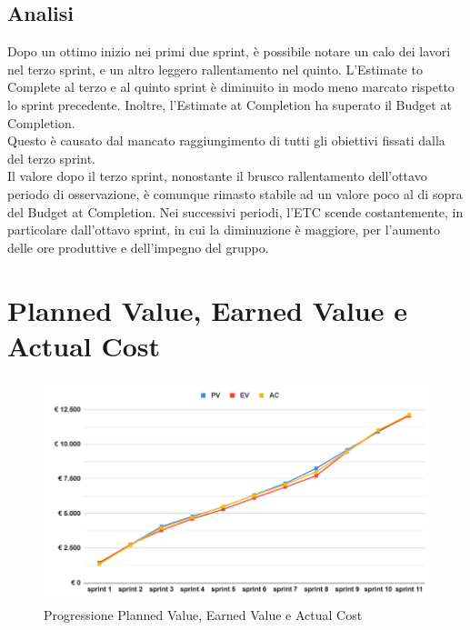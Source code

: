 \subsection{Analisi}
Dopo un ottimo inizio nei primi due sprint, è possibile notare un calo dei lavori nel terzo sprint, e un altro leggero rallentamento nel quinto. L'Estimate to Complete al terzo e al quinto sprint è diminuito in modo meno marcato rispetto lo sprint precedente. Inoltre, l'Estimate at Completion ha superato il Budget at Completion.\\
Questo è causato dal mancato raggiungimento di tutti gli obiettivi fissati dalla  del terzo sprint.\\
Il valore dopo il terzo sprint, nonostante il brusco rallentamento dell'ottavo periodo di osservazione, è comunque rimasto stabile ad un valore poco al di sopra del Budget at Completion.
Nei successivi periodi, l'ETC scende costantemente, in particolare dall'ottavo sprint, in cui la diminuzione è maggiore, per l'aumento delle ore produttive e dell'impegno del gruppo.
\section{Planned Value, Earned Value e Actual Cost}
\begin{figure}[H]
    \centering
    \includegraphics[width=0.8\linewidth]{PVEVAC.png}
    \caption{Progressione Planned Value, Earned Value e Actual Cost}
\end{figure}
